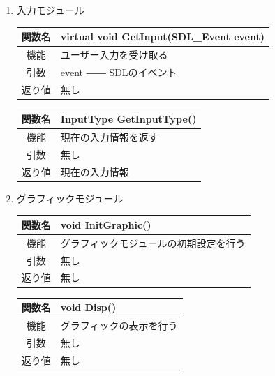\documentclass{jarticle}
\begin{document}
\begin{enumerate}
    \item 入力モジュール
    \begin{table}[H]
        \label{table:fanc_c4-1}
        \begin{center}
            \begin{tabular}{|c||p{30em}|}\hline
                関数名&virtual void GetInput(SDL\_Event event)\\\hline
                機能&ユーザー入力を受け取る\\
                引数&event ―― SDLのイベント\\
                返り値&無し\\\hline
            \end{tabular}
        \end{center}
    \end{table}
    \begin{table}[H]
        \label{table:fanc_c4-2}
        \begin{center}
            \begin{tabular}{|c||p{30em}|}\hline
                関数名&InputType GetInputType()\\\hline
                機能&現在の入力情報を返す\\
                引数&無し\\
                返り値&現在の入力情報\\\hline
            \end{tabular}
        \end{center}
    \end{table}
    \item グラフィックモジュール
    \begin{table}[H]
        \label{table:fanc_c5-1}
        \begin{center}
            \begin{tabular}{|c||p{30em}|}\hline
                関数名&void InitGraphic()\\\hline
                機能&グラフィックモジュールの初期設定を行う\\
                引数&無し\\
                返り値&無し\\\hline
            \end{tabular}
        \end{center}
    \end{table}
    \begin{table}[H]
        \label{table:fanc_c5-1}
        \begin{center}
            \begin{tabular}{|c||p{30em}|}\hline
                関数名&void Disp()\\\hline
                機能&グラフィックの表示を行う\\
                引数&無し\\
                返り値&無し\\\hline
            \end{tabular}
        \end{center}
    \end{table}

\end{enumerate}
\end{document}
